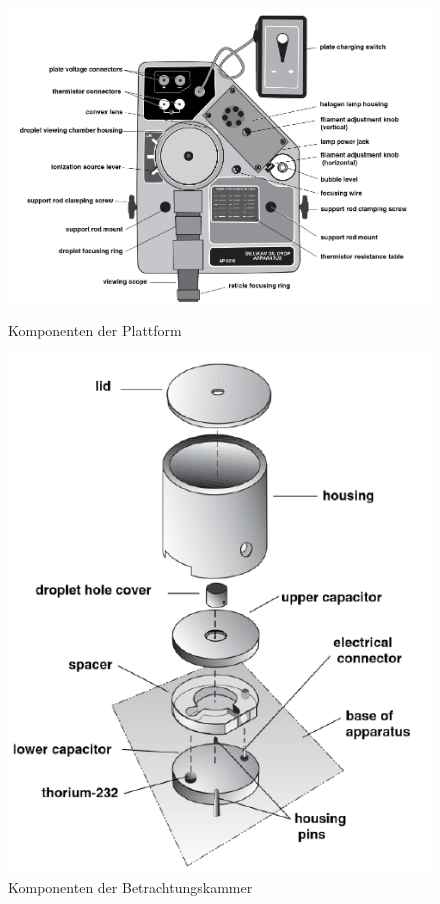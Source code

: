 \begin{figure}[h]
	\centering
	\begin{minipage}[t]{0.45\textwidth}
		\centering
		\includegraphics[scale=0.5]{bilder/pdf/plattformKomponenten.pdf}
		\caption{Komponenten der Plattform}
		\label{fig:plattformKomp}
	\end{minipage}
	\hfill
	\begin{minipage}[t]{0.45\textwidth}
		\centering
		\includegraphics[width=\textwidth]{bilder/pdf/BetrachtungsKammerKomponenten.pdf}
		\caption{Komponenten der Betrachtungskammer}
		\label{fig:betrachtKomp}
	\end{minipage}
\end{figure}





